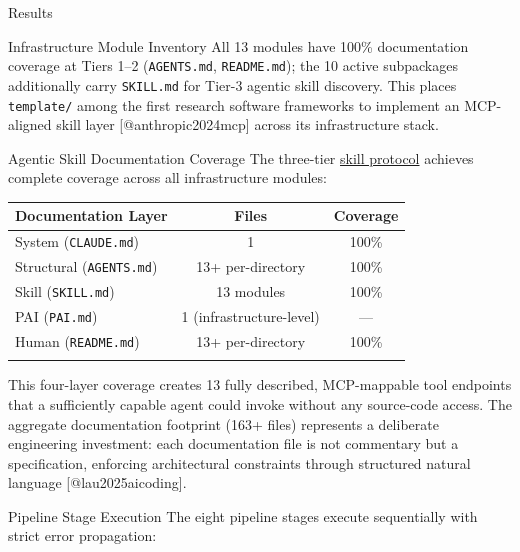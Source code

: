 \documentclass[
  ignorenonframetext,
]{beamer}
\newcounter{none} %
\begin{document}
\begin{frame}[fragile]{Results}
\begin{block}{Infrastructure Module Inventory}
All 13 modules have 100\% documentation coverage at Tiers 1--2
(\texttt{AGENTS.md}, \texttt{README.md}); the 10 active subpackages
additionally carry \texttt{SKILL.md} for Tier-3 agentic skill discovery.
This places \texttt{template/} among the first research software
frameworks to implement an MCP-aligned skill layer
{[}@anthropic2024mcp{]} across its infrastructure stack.
\end{block}

\begin{block}{Agentic Skill Documentation Coverage}
\protect{}\label{agentic-skill-documentation-coverage}
The three-tier
\href{03c_documentation.md\#agentic-skill-architecture}{skill protocol}
achieves complete coverage across all infrastructure modules:

{\def\LTcaptype{none} %
\begin{longtable}[]{@{}lcc@{}}
\toprule\noalign{}
Documentation Layer & Files & Coverage \\
\midrule\noalign{}
\endhead
System (\texttt{CLAUDE.md}) & 1 & 100\% \\
Structural (\texttt{AGENTS.md}) & 13+ per-directory & 100\% \\
Skill (\texttt{SKILL.md}) & 13 modules & 100\% \\
PAI (\texttt{PAI.md}) & 1 (infrastructure-level) & --- \\
Human (\texttt{README.md}) & 13+ per-directory & 100\% \\
\bottomrule\noalign{}
\end{longtable}
}

This four-layer coverage creates 13 fully described, MCP-mappable tool
endpoints that a sufficiently capable agent could invoke without any
source-code access. The aggregate documentation footprint (163+ files)
represents a deliberate engineering investment: each documentation file
is not commentary but a specification, enforcing architectural
constraints through structured natural language {[}@lau2025aicoding{]}.
\end{block}

\begin{block}{Pipeline Stage Execution}
\protect{}\label{pipeline-stage-execution}
The eight pipeline stages execute sequentially with strict error
propagation:


\end{block}
\end{frame}
\end{document}
